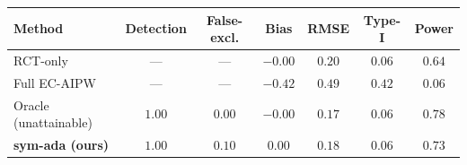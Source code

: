 \documentclass[border=8pt]{standalone}
\begin{document}
\renewcommand{\arraystretch}{1.35}\large\begin{tabular}{lcccccc}
\toprule
Method & Detection & False-excl. & Bias & RMSE & Type-I & Power\\
\midrule
RCT-only & --- & --- & $-0.00$ & $0.20$ & $0.06$ & $0.64$\\
Full EC-AIPW & --- & --- & $-0.42$ & $0.49$ & $0.42$ & $0.06$\\
Oracle (unattainable) & $1.00$ & $0.00$ & $-0.00$ & $0.17$ & $0.06$ & $0.78$\\
\midrule
\textbf{sym-ada (ours)} & $1.00$ & $0.10$ & $\bm{0.00}$ & $\bm{0.18}$ & $\bm{0.06}$ & $\bm{0.73}$\\
\bottomrule
\end{tabular}
\end{document}

